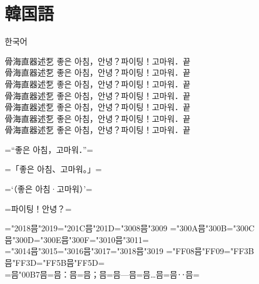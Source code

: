\documentclass[landscape]{utarticle}
\begin{document}
\section{韓国語}
\upkorgtb 한국어

\upkorrml 骨海直器述乭 좋은 아침，안녕？파이팅！고마워．끝\\
\upkorrmm 骨海直器述乭 좋은 아침，안녕？파이팅！고마워．끝\\
\upkorrmb 骨海直器述乭 좋은 아침，안녕？파이팅！고마워．끝\\
\upkorgtm 骨海直器述乭 좋은 아침，안녕？파이팅！고마워．끝\\
\upkorgtb 骨海直器述乭 좋은 아침，안녕？파이팅！고마워．끝\\
\upkorgte 骨海直器述乭 좋은 아침，안녕？파이팅！고마워．끝\\
\upkorgth 骨海直器述乭 좋은 아침，안녕？파이팅！고마워．끝\\

\upkorrmm

=“좋은 아침，고마워．”=

=「좋은 아침、고마워。」=

=‘（좋은 아침·고마워）’=

=파이팅！안녕？=

=\kchar"2018믐\kchar"2019=\kchar"201C믐\kchar"201D=\kchar"3008믐\kchar"3009%
=\kchar"300A믐\kchar"300B=\kchar"300C믐\kchar"300D=\kchar"300E믐\kchar"300F=\kchar"3010믐\kchar"3011=\\
=\kchar"3014믐\kchar"3015=\kchar"3016믐\kchar"3017=\kchar"3018믐\kchar"3019%
=\kchar"FF08믐\kchar"FF09=\kchar"FF3B믐\kchar"FF3D=\kchar"FF5B믐\kchar"FF5D=\\
=믐\kchar"00B7믐=믐：믐=믐；믐=믐—믐=믐…믐=믐‥믐=
\end{document}
